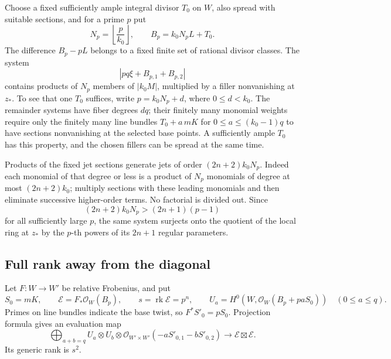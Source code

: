 \documentclass[11pt,letterpaper]{article}
\theoremstyle{definition}
\theoremstyle{remark}
\begin{document}
Choose a fixed sufficiently ample integral divisor \(T_0\) on \(W\),
also spread with suitable sections, and for a prime \(p\) put
\begin{equation}
\label{proj:fr:bp}
 N_p=\left\lfloor\frac p{k_0}\right\rfloor,\qquad
 B_p=k_0N_pL+T_0.
\end{equation}
The difference \(B_p-pL\) belongs to a fixed finite set of rational
divisor classes. The system
\[
 |pq\xi+B_{p,1}+B_{p,2}|
\]
contains products of \(N_p\) members of \(|k_0M|\), multiplied by a
filler nonvanishing at \(z_*\). To see that one \(T_0\) suffices, write
\(p=k_0N_p+d\), where \(0\leq d<k_0\). The remainder systems have fiber
degrees \(dq\); their finitely many monomial weights require only the
finitely many line bundles \(T_0+a\,mK\) for
\(0\leq a\leq(k_0-1)q\) to have sections nonvanishing at the selected
base points. A sufficiently ample \(T_0\) has this property, and the
chosen fillers can be spread at the same time.

Products of the fixed jet sections generate jets of order
\((2n+2)k_0N_p\). Indeed each monomial of that degree or less is a
product of \(N_p\) monomials of degree at most \((2n+2)k_0\);
multiply sections with these leading monomials and then eliminate
successive higher-order terms. No factorial is divided out. Since
\[
 (2n+2)k_0N_p>(2n+1)(p-1)
\]
for all sufficiently large \(p\), the same system surjects onto the
quotient of the local ring at \(z_*\) by the \(p\)-th powers of its
\(2n+1\) regular parameters.

\subsection{Full rank away from the diagonal}

Let \(F:W\to W'\) be relative Frobenius, and put
\[
 S_0=mK,\qquad
 \mathcal E=F_*\mathcal{O}_W(B_p),\qquad
 s=\operatorname{rk}\mathcal E=p^n,\qquad
 U_a=H^0(W,\mathcal{O}_W(B_p+paS_0))
 \quad(0\leq a\leq q).
\]
Primes on line bundles indicate the base twist, so
\(F^*S'_0=pS_0\). Projection formula gives an evaluation map
\begin{equation}
\label{proj:fr:evaluation}
 \bigoplus_{a+b=q}
 U_a\otimes U_b\otimes
 \mathcal{O}_{W'\times W'}(-aS'_{0,1}-bS'_{0,2})
 \longrightarrow\mathcal E\boxtimes\mathcal E.
\end{equation}
Its generic rank is \(s^2\).
\end{document}

